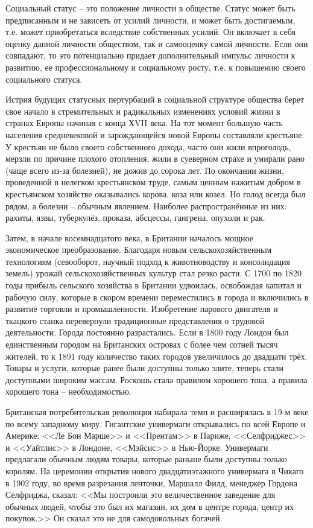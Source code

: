 Социальный статус -- это положение личности в обществе. Статус может быть
предписанным и не зависеть от усилий личности, и может быть достигаемым, т.е.
может приобретаться вследствие собственных усилий. Он включает в себя оценку
данной личности обществом, так и самооценку самой личности. Если они совпадают,
то это потенциально придает дополнительный импульс личности к развитию, ее
профессиональному и социальному росту, т.е. к повышению своего социального
статуса.

Истрия будущих статусных пертурбаций в социальной структуре общества берет свое
начало в стремительных и радикальных изменениях условий жизни в странах Европы
начиная с конца ХVII века. На тот момент большую часть населения средневековой
и зарождающейся новой Европы составляли крестьяне. У крестьян не было своего
собственного дохода, часто они жили впроголодь, мерзли по причине плохого
отопления,  жили в суеверном страхе и умирали  рано (чаще всего из-за болезней),
не дожив до сорока лет. По окончании жизни, проведенной в нелегком крестьянском
труде, самым ценным нажитым добром в крестьянском хозяйстве оказывались корова,
коза или козел. Но голод всегда был рядом, а болезни -- обычным явлением.
Наиболее распространённые из них: рахиты, язвы, туберкулёз, проказа, абсцессы,
гангрена, опухоли и рак.

Затем, в начале восемнадцатого века, в Британии началось мощное экономическое
преобразование. Благодаря новым сельскохозяйственным технологиям (севооборот,
научный подход к животноводству и консолидация земель) урожай
сельскохозяйственных культур стал резко расти. С 1700 по 1820 годы прибыль
сельского хозяйства в Британии удвоилась, освобождая капитал и рабочую силу,
которые в скором времени переместились в города и включились в развитие торговли
и промышленности. Изобретение парового двигателя и ткацкого станка перевернули
традиционные представления о трудовой деятельности. Города постоянно
разрастались. Если в 1800 году Лондон был единственным городом на Британских
островах с более чем сотней тысяч жителей, то к 1891 году количество таких
городов увеличилось до двадцати трёх. Товары и услуги, которые ранее были
доступны только элите, теперь стали доступными широким массам. Роскошь стала
правилом хорошего тона, а правила хорошего тона -- необходимостью.

Британская потребительская революция набирала темп и расширялась в 19-м веке
по всему западному миру. Гигантские универмаги открывались по всей Европе и
Америке: <<Ле Бон Марше>> и <<Прентам>> в Париже, <<Селфриджес>> и <<Уайтлис>> в
Лондоне, <<Мэйсис>> в Нью-Йорке. Универмаги предлагали обычным людям товары,
которые раньше были доступны только королям. На церемонии открытия нового
двадцатиэтажного универмага в Чикаго в 1902 году, во время разрезания ленточки,
Маршалл Филд, менеджер Гордона Селфриджа, сказал: <<Мы построили это
величественное заведение для обычных людей, чтобы это был их магазин, их дом в
центре города, центр их покупок.>> Он сказал это не для самодовольных
богачей\autocite{debotton}. 

